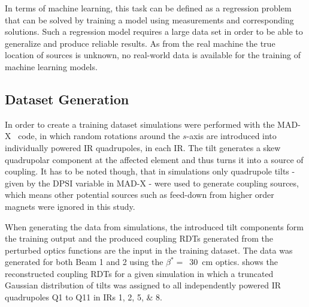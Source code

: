 In terms of machine learning, this task can be defined as a regression problem that can be solved by training a model using measurements and corresponding solutions.
Such a regression model requires a large data set in order to be able to generalize and produce reliable results.
As from the real machine the true location of sources is unknown, no real-world data is available for the training of machine learning models.

\subsection{Dataset Generation}

In order to create a training dataset simulations were performed with the MAD-X~\cite{CODE:MADX_guide} code, in which random rotations around the \(s\)-axis are introduced into individually powered IR quadrupoles, in each IR.
The tilt generates a skew quadrupolar component at the affected element and thus turns it into a source of coupling.
It has to be noted though, that in simulations only quadrupole tilts - given by the \(\mathrm{DPSI}\) variable in MAD-X - were used to generate coupling sources, which means other potential sources such as feed-down from higher order magnets were ignored in this study.

When generating the data from simulations, the introduced tilt components form the training output and the produced coupling RDTs generated from the perturbed optics functions are the input in the training dataset.
The data was generated for both Beam 1 and 2 using the \(\beta^{\ast}=\)~\qty{30}{\centi\meter} optics.
 shows the reconstructed coupling RDTs for a given simulation in which a truncated Gaussian distribution of tilts was assigned to all independently powered IR quadrupoles Q\num{1} to Q\num{11} in IRs \numlist{1;2;5;8}.

